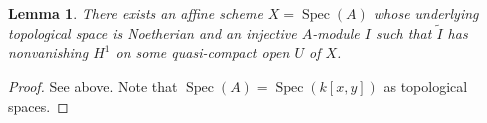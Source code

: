 \documentclass[10pt,a4paper]{amsart}
\theoremstyle{plain}
\newtheorem{lemma}[subsection]{Lemma}
\theoremstyle{definition}
\theoremstyle{remark}
\numberwithin{equation}{subsection}
\def\Spec{\mathop{\mathrm{Spec}}}
\begin{document}
\begin{lemma}
\label{lemma-nonvanishing}
There exists an affine scheme $X = \Spec(A)$ whose underlying
topological space is Noetherian and an injective
$A$-module $I$ such that $\widetilde{I}$ has nonvanishing $H^1$
on some quasi-compact open $U$ of $X$.
\end{lemma}

\begin{proof}
See above. Note that $\Spec(A) = \Spec(k[x, y])$ as topological spaces.
\end{proof}
\end{document}
